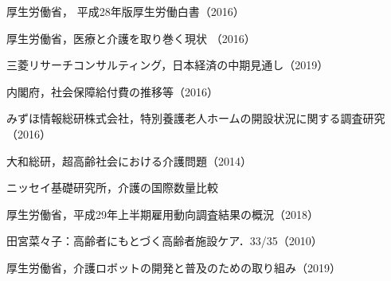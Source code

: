 \begin{thebibliography}{99}
  厚生労働省， 平成28年版厚生労働白書（2016）

  厚生労働省，医療と介護を取り巻く現状 （2016）

  三菱リサーチコンサルティング，日本経済の中期見通し（2019）

  内閣府，社会保障給付費の推移等（2016）

  みずほ情報総研株式会社，特別養護老人ホームの開設状況に関する調査研究（2016）

  大和総研，超高齢社会における介護問題（2014）

  ニッセイ基礎研究所，介護の国際数量比較

  厚生労働省，平成29年上半期雇用動向調査結果の概況（2018）


  田宮菜々子：高齢者にもとづく高齢者施設ケア．33/35（2010）

  厚生労働省，介護ロボットの開発と普及のための取り組み（2019）




\end{thebibliography}
